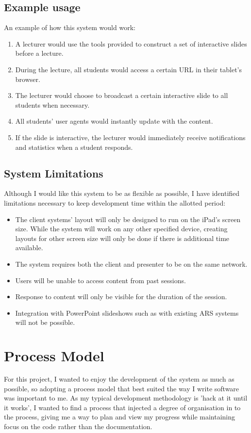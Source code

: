 \documentclass[a4papert,11pt,notitlepage]{ltxdoc}
\begin{document}
\subsection{Example usage}
An example of how this system would work:
\begin{enumerate}
\item A lecturer would use the tools provided to construct a set of interactive slides before a lecture.
\item During the lecture, all students would access a certain URL in their tablet's browser.
\item The lecturer would choose to broadcast a certain interactive slide to all students when necessary.
\item All students' user agents would instantly update with the content.
\item If the slide is interactive, the lecturer would immediately receive notifications and statistics when a student responds.
\end{enumerate}

\subsection{System Limitations}
Although I would like this system to be as flexible as possible, I have identified limitations necessary to keep development time within the allotted period:
\begin{itemize}
\item The client systems' layout will only be designed to run on the iPad's screen size. While the system will work on any other specified device, creating layouts for other screen size will only be done if there is additional time available.
\item The system requires both the client and presenter to be on the same network.
\item Users will be unable to access content from past sessions.
\item Response to content will only be visible for the duration of the session.
\item Integration with PowerPoint slideshows such as with existing ARS systems will not be possible.
\end{itemize}

\section{Process Model}
For this project, I wanted to enjoy the development of the system as much as possible, so adopting a process model that best suited the way I write software was important to me. As my typical development methodology is 'hack at it until it works', I wanted to find a process that injected a degree of organisation in to the process, giving me a way to plan and view my progress while maintaining focus on the code rather than the documentation.
\end{document}
